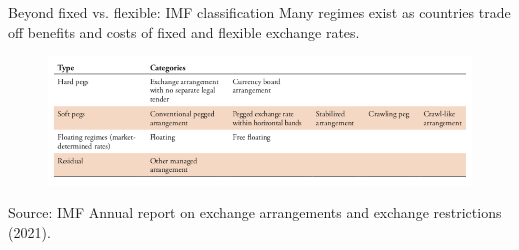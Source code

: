 \documentclass{beamer}
\begin{document}
\begin{frame}{Beyond fixed vs. flexible: IMF classification}
  Many regimes exist as countries trade off benefits and costs of fixed and flexible exchange rates.
  \begin{figure}[ht]
	\centering
	\includegraphics[width = 1.1\textwidth]{FIGURES/IMF_exchange_rate_regimes}
  \end{figure}
	\tiny Source: IMF Annual report on exchange arrangements and exchange restrictions (2021).
\end{frame}
\end{document}
